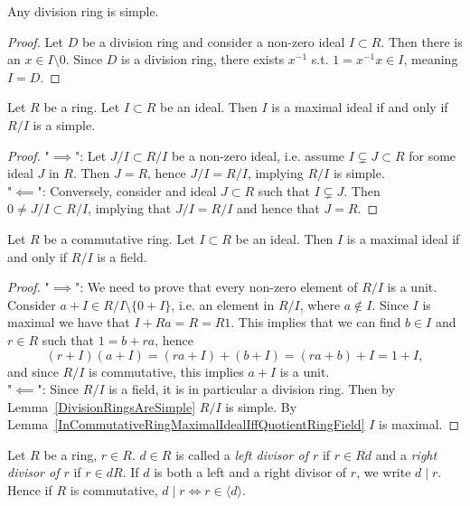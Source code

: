 \begin{lemma}\label{DivisionRingsAreSimple}
    Any division ring is simple.
\end{lemma}
\begin{proof}
    Let $D$ be a division ring and consider a non-zero ideal $I\subset R$. Then there is an $x\in I\setminus 0$. Since $D$ is a division ring, there exists $x^{-1}$ s.t. $1 = x^{-1}x\in I$, meaning $I = D$.
\end{proof}
\begin{lemma}\label{MaximalIdealIffQuotientRingSimple}
    Let $R$ be a ring. Let $I\subset R$ be an ideal. Then $I$ is a maximal ideal if and only if $R/I$ is a simple.
\end{lemma}
\begin{proof}
    "$\implies$": Let $J/I\subset R/I$ be a non-zero ideal, i.e. assume $I\subsetneq J\subset R$ for some ideal $J$ in $R$. Then $J = R$, hence $J/I= R/I$, implying $R/I$ is simple.\\
    "$\impliedby$": Conversely, consider and ideal $J\subset R$ such that $I\subsetneq J$. Then $0\neq J/I\subset R/I$, implying that $J/I = R/I$ and hence that $J=R$. 
\end{proof}
\begin{proposition}\label{InCommutativeRingMaximalIdealIffQuotientRingField}
    Let $R$ be a commutative ring. Let $I\subset R$ be an ideal. Then $I$ is a maximal ideal if and only if $R/I$ is a field.
\end{proposition}
\begin{proof}
    "$\implies$": We need to prove that every non-zero element of $R/I$ is a unit. Consider $a + I \in R/I\setminus \{0+I\}$, i.e. an element in $R/I$, where $a \notin I$. Since $I$ is maximal we have that $I+Ra = R = R1$. This implies that we can find $b\in I$ and $r \in R$ such that $1 = b + ra$, hence
    $$(r+I)(a+I) = (ra + I) + (b+I) = (ra+b)+I = 1 + I,$$
    and since $R/I$ is commutative, this implies $a+I$ is a unit.\\
    "$\impliedby$": Since $R/I$ is a field, it is in particular a division ring. Then by Lemma~\ref{DivisionRingsAreSimple} $R/I$ is simple. By Lemma~\ref{InCommutativeRingMaximalIdealIffQuotientRingField} $I$ is maximal.  
\end{proof}
\begin{definition}
    Let $R$ be a ring, $r\in R$. $d\in R$ is called a \textit{left divisor of $r$} if $r\in Rd$ and a \textit{right divisor of $r$} if $r\in dR$. If $d$ is both a left and a right divisor of $r$, we write $d\mid r$. Hence if $R$ is commutative, $d\mid r \iff r\in \langle d\rangle$.
\end{definition}
